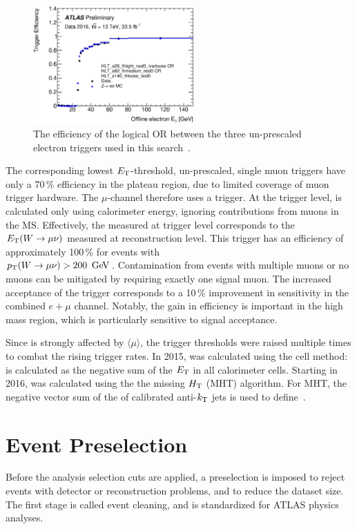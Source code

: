 \begin{figure}[htbp]
\centering
\includegraphics[width=0.55\textwidth]{figures/EventSelection/Eff_Et_singleOR_full2016}
\caption[Electron trigger efficiencies for 2016]{The efficiency of the logical OR between the three un-prescaled electron triggers used in this search~\cite{trig_eff_2016}.}
\label{fig:trig_eff}
\end{figure}

The corresponding lowest $E_{\rm T}$-threshold, un-prescaled, single muon triggers have only a 70\,\% efficiency in the plateau region, due to limited coverage of muon trigger hardware. The $\mu$-channel therefore uses a \MET trigger. At the trigger level, \MET is calculated only using calorimeter energy, ignoring contributions from muons in the MS. Effectively, the \MET measured at trigger level corresponds to the $E_{\rm T}(W\rightarrow\mu\nu)$ measured at reconstruction level.  This trigger has an efficiency of approximately 100\,\% for events with \\$\pT(W\ra\mu\nu)>200\,\GeV$. Contamination from events with multiple muons or no muons can be mitigated by requiring exactly one signal muon. The increased acceptance of the \MET trigger corresponds to a 10\,\% improvement in sensitivity in the combined $e+\mu$ channel. Notably, the gain in efficiency is important in the high mass region, which is particularly sensitive to signal acceptance. 

Since \MET is strongly affected by $\langle\mu\rangle$, the \MET trigger thresholds were raised multiple times to combat the rising trigger rates. In 2015, \MET was calculated using the cell method: \MET is calculated as the negative sum of the $E_{\rm T}$ in all calorimeter cells. Starting in 2016, \MET was calculated using the the missing $H_{\rm T}$ (MHT) algorithm. For MHT, the negative vector sum of the \pT of calibrated anti-$k_{\rm T}$ jets is used to define \MET.

%
\section{Event Preselection}
\label{ch:event_selection:pre}
Before the analysis selection cuts are applied, a preselection is imposed to reject events with detector or reconstruction problems, and to reduce the dataset size. The first stage is called event cleaning, and is standardized for ATLAS physics analyses.

